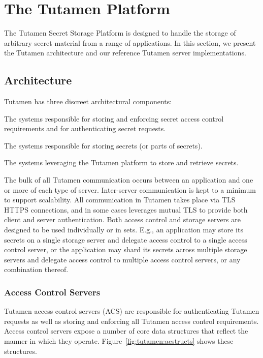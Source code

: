 \section{The Tutamen Platform}
\label{sec:tutamen}

The Tutamen Secret Storage Platform is designed to handle the storage
of arbitrary secret material from a range of applications. In this
section, we present the Tutamen architecture and our reference Tutamen
server implementations.

\subsection{Architecture}
\label{sec:tutamen:arch}

Tutamen has three discreet architectural components:

\begin{packed_desc}
\item[Access Control Servers (ACS):] The systems responsible for
  storing and enforcing secret access control requirements and for
  authenticating secret requests.
\item[Storage Servers (SS):] The systems responsible for storing
  secrets (or parts of secrets).
\item[Applications:] The systems leveraging the Tutamen platform to
  store and retrieve secrets.
\end{packed_desc}

The bulk of all Tutamen communication occurs between an application
and one or more of each type of server. Inter-server communication is
kept to a minimum to support scalability. All communication in Tutamen
takes place via TLS~\cite{dierks2008} HTTPS connections, and in some
cases leverages mutual TLS to provide both client and server
authentication. Both access control and storage servers are designed
to be used individually or in sets. E.g., an application may store its
secrets on a single storage server and delegate access control to a
single access control server, or the application may shard its secrets
across multiple storage servers and delegate access control to
multiple access control servers, or any combination thereof.

\subsubsection{Access Control Servers}
\label{sec:tutamen:arch:acs}

Tutamen access control servers (ACS) are responsible for
authenticating Tutamen requests as well as storing and enforcing all
Tutamen access control requirements. Access control servers expose a
number of core data structures that reflect the manner in which they
operate. Figure~\ref{fig:tutamen:acstructs} shows these structures.

